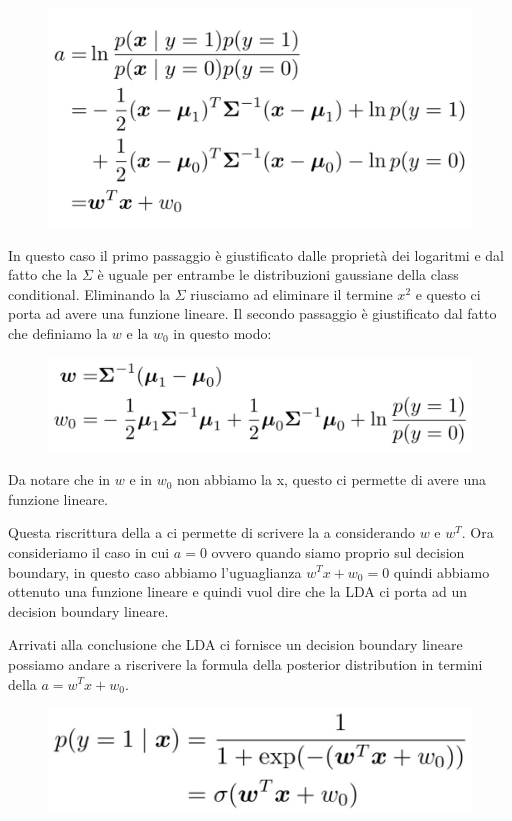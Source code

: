 \documentclass[14pt]{extreport}
\begin{document}
\begin{figure}[H]
	\centering
	\includegraphics[width=0.7\linewidth]{170.jpeg}
\end{figure}

In questo caso il primo passaggio è giustificato dalle proprietà dei logaritmi e dal fatto che la $\Sigma$ è uguale per entrambe le distribuzioni
gaussiane della class conditional. Eliminando la $\Sigma$ riusciamo ad eliminare il termine $x^2$ e questo ci porta ad avere una funzione lineare. Il
secondo passaggio è giustificato dal fatto che definiamo la $w$ e la $w_0$ in questo modo:

\begin{figure}[H]
	\centering
	\includegraphics[width=0.7\linewidth]{171.jpeg}
\end{figure}
Da notare che in $w$ e in $w_0$ non abbiamo la x, questo ci permette di avere una funzione lineare.

Questa riscrittura della a ci permette di scrivere la a considerando $w$ e $w^T$. Ora consideriamo il caso in cui $a=0$ ovvero quando siamo proprio
sul decision boundary, in questo caso abbiamo l'uguaglianza $w^Tx+w_0 = 0$ quindi abbiamo ottenuto una funzione lineare e quindi vuol dire che la LDA
ci porta ad un decision boundary lineare.

Arrivati alla conclusione che LDA ci fornisce un decision boundary lineare possiamo andare a riscrivere la formula della posterior distribution in
termini della $a = w^Tx+w_0$.

\begin{figure}[H]
	\centering
	\includegraphics[width=0.5\linewidth]{172.jpeg}
\end{figure}
\end{document}
